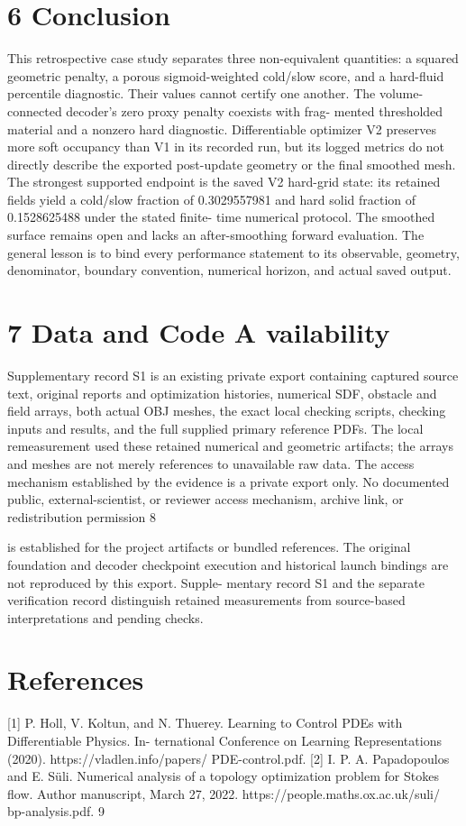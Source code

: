 \documentclass[11pt]{article}
\begin{document}
\section*{6 Conclusion}

This retrospective case study separates three non-equivalent quantities: a squared geometric penalty,
a porous sigmoid-weighted cold/slow score, and a hard-fluid percentile diagnostic. Their values
cannot certify one another. The volume-connected decoder’s zero proxy penalty coexists with frag-
mented thresholded material and a nonzero hard diagnostic. Differentiable optimizer V2 preserves
more soft occupancy than V1 in its recorded run, but its logged metrics do not directly describe
the exported post-update geometry or the final smoothed mesh.
The strongest supported endpoint is the saved V2 hard-grid state: its retained fields yield a
cold/slow fraction of 0.3029557981 and hard solid fraction of 0.1528625488 under the stated finite-
time numerical protocol. The smoothed surface remains open and lacks an after-smoothing forward
evaluation. The general lesson is to bind every performance statement to its observable, geometry,
denominator, boundary convention, numerical horizon, and actual saved output.

\section*{7 Data and Code A vailability}

Supplementary record S1 is an existing private export containing captured source text, original
reports and optimization histories, numerical SDF, obstacle and field arrays, both actual OBJ
meshes, the exact local checking scripts, checking inputs and results, and the full supplied primary
reference PDFs. The local remeasurement used these retained numerical and geometric artifacts;
the arrays and meshes are not merely references to unavailable raw data.
The access mechanism established by the evidence is a private export only. No documented
public, external-scientist, or reviewer access mechanism, archive link, or redistribution permission
8

is established for the project artifacts or bundled references. The original foundation and decoder
checkpoint execution and historical launch bindings are not reproduced by this export. Supple-
mentary record S1 and the separate verification record distinguish retained measurements from
source-based interpretations and pending checks.

\section*{References}

[1] P. Holl, V. Koltun, and N. Thuerey. Learning to Control PDEs with Differentiable Physics. In-
ternational Conference on Learning Representations (2020). https://vladlen.info/papers/
PDE-control.pdf.
[2] I. P. A. Papadopoulos and E. Süli. Numerical analysis of a topology optimization problem
for Stokes flow. Author manuscript, March 27, 2022. https://people.maths.ox.ac.uk/suli/
bp-analysis.pdf.
9
\end{document}
